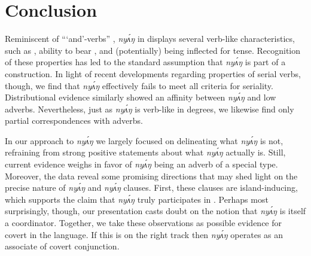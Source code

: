 \documentclass[output=paper,modfonts,nonflat,
hidelinks
]{langsci/langscibook}
\begin{document}
\section{Conclusion}\label{sec:duncan-et-al:6}


Reminiscent of  ```and'-verbs'' \citep{brown2008verbs}, \textit{ny\'{ʌ}ŋ} in  displays several verb-like characteristics, such as , ability to bear , and (potentially) being inflected for tense. Recognition of these properties has led to the standard assumption that \textit{ny\'{ʌ}ŋ} is part of a  construction. In light of recent developments regarding properties of  serial verbs, though, we find that \textit{ny\'{ʌ}ŋ} effectively fails to meet all criteria for seriality. Distributional evidence similarly showed an affinity between \textit{ny\'{ʌ}ŋ} and low adverbs. Nevertheless, just as \textit{ny\'{ʌ}ŋ} is verb-like in degrees, we likewise find only partial correspondences with adverbs.

In our approach to \textit{ny\'{ʌ}ŋ} we largely focused on delineating what \textit{ny\'{ʌ}ŋ} is not, refraining from strong positive statements about what \textit{ny\'{ʌ}ŋ} actually is. Still, current evidence weighs in favor of \textit{ny\'{ʌ}ŋ} being an adverb of a special type. Moreover, the data reveal some promising directions that may shed light on the precise nature of \textit{ny\'{ʌ}ŋ} and \textit{ny\'{ʌ}ŋ} clauses. First, these clauses are island-inducing, which supports the claim that \textit{ny\'{ʌ}ŋ} truly participates in . Perhaps most surprisingly, though, our presentation casts doubt on the notion that \textit{ny\'{ʌ}ŋ} is itself a coordinator. Together, we take these observations as possible evidence for covert  in the language. If this is on the right track then \textit{ny\'{ʌ}ŋ} operates as an associate of covert conjunction. 
\end{document}
